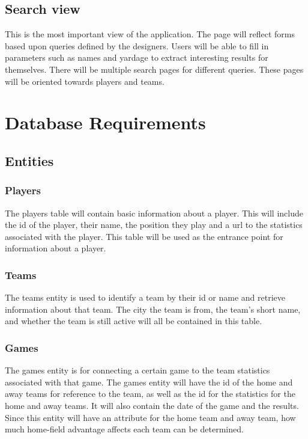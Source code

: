\documentclass[12pt,letterpaper]{article}
\begin{document}
\subsection{Search view}
This is the most important view of the application. The page will reflect forms based upon queries defined by the designers. Users will be able to fill in parameters such as names and yardage to extract interesting results for themselves. There will be multiple search pages for different queries. These pages will be oriented towards players and teams.

\clearpage\null
\section{Database Requirements}
\subsection{Entities}
\subsubsection{Players}
The players table will contain basic information about a player. This will include the id of the player, their name, the position they play and a url to the statistics associated with the player. This table will be used as the entrance point for information about a player. 

\subsubsection{Teams}
The teams entity is used to identify a team by their id or name and retrieve information about that team. The city the team is from, the team's short name, and whether the team is still active will all be contained in this table.

\subsubsection{Games}
The games entity is for connecting a certain game to the team statistics associated with that game. The games entity will have the id of the home and away teams for reference to the team, as well as the id for the statistics for the home and away teams. It will also contain the date of the game and the results. Since this entity will have an attribute for the home team and away team, how much home-field advantage affects each team can be determined.
\end{document}
